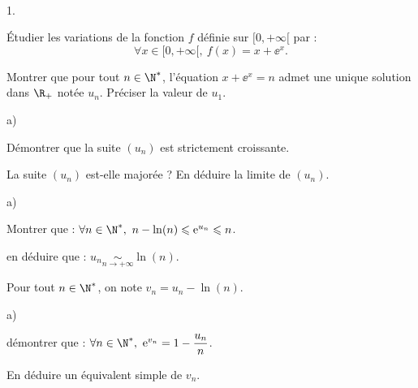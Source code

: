 \documentclass[11pt]{article}%
\begin{document}
 \begin{exercice}~
 \begin{noliste}{1.}
\item \'Etudier les variations de la fonction $f$ définie sur $[0, + 
 \infty[$ par :
 \[
 \forall x \in [0, + \infty[, \ f(x)=x+ \ee^x.
 \]
 \item Montrer que pour tout $n \in \N^*$, l'équation $x+ \ee^x =n$ 
admet 
 une unique solution dans $\R_+$ notée $u_n$. Préciser la valeur de 
 $u_1$.
 \item \begin{noliste}{a)}
 	\item Démontrer que la suite $(u_n)$ est strictement croissante.
 	\item La suite $(u_n)$ est-elle majorée ? En déduire la limite 
 de $(u_n)$.
 	\end{noliste}
 \item \begin{noliste}{a)}
 	\item Montrer que : $\forall n \in \N^*, \ n- \ln(n) \leq 
 \ee^{u_n} \leq n$.
 	\item en déduire que : $ u_n \underset{n \to + \infty}{\sim} 
 \ln(n)$.
 	\end{noliste}
 \item Pour tout $n \in \N^*$, on note $v_n=u_n- \ln(n)$. 
 \begin{noliste}{a)}
 	\item démontrer que : $ \forall n \in \N^*, \ \ee^{v_n} = 1- 
 \dfrac{u_n}{n}$.
 	\item En déduire un équivalent simple de $v_n$.
 	\end{noliste}
 \end{noliste}
 \end{exercice}
  
 
 
 
 
 
\end{document}
